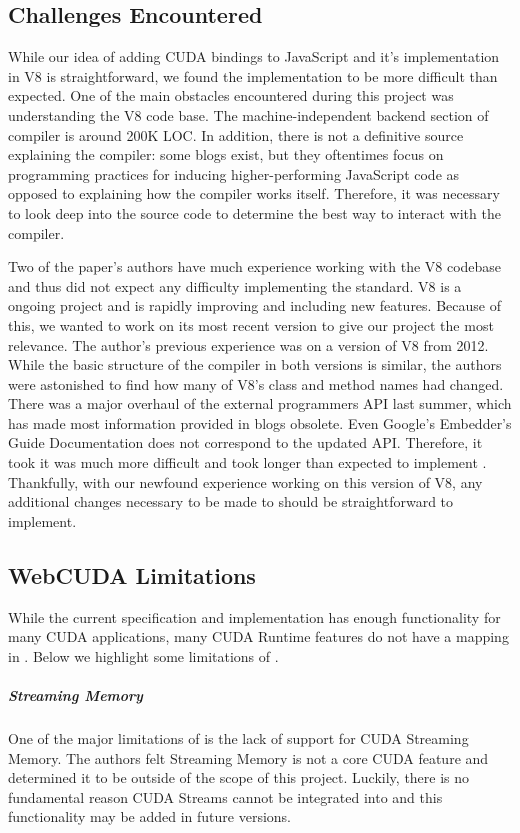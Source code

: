 

\subsection{Challenges Encountered} \label{challenges} While our idea of adding
CUDA bindings to JavaScript and it's implementation in V8 is straightforward,
we found the implementation to be more difficult than expected.  One of the main obstacles
encountered during this project was understanding the V8 code base. The
machine-independent backend section of compiler is around 200K LOC. In addition,
there is not a definitive source explaining the compiler: some blogs exist, but
they oftentimes focus on programming practices for inducing higher-performing
JavaScript code as opposed to explaining how the compiler works itself.
Therefore, it was necessary to look deep into the source code to determine the
best way to interact with the compiler.

Two of the paper's authors have much experience working with the V8 codebase and
thus did not expect any difficulty implementing the \name standard. V8 is a
ongoing project and is rapidly improving and including new features. Because of
this, we wanted to work on its most recent version to give our project the most
relevance. The author's previous experience was on a version of V8 from 2012.
While the basic structure of the compiler in both versions is similar, the
authors were astonished to find how many of V8's class and method names had
changed. There was a major overhaul of the external programmers API last summer,
which has made most information provided in blogs obsolete. Even Google's
Embedder's Guide Documentation \cite{embeddersGuide} does not correspond to the
updated API.  Therefore, it took it was much more difficult and took longer than
expected to implement \name. Thankfully, with our newfound experience working on
this version of V8, any additional changes necessary to be made to \name should
be straightforward to implement.

\subsection{WebCUDA Limitations}
While the current \name specification and implementation has enough
functionality for many CUDA applications, many CUDA Runtime features do not
have a mapping in \namens. Below we highlight some limitations of \namens.

\subparagraph{Streaming Memory} One of the major limitations of \namens is the
lack of support for CUDA Streaming Memory. The authors felt Streaming Memory is
not a core CUDA feature and determined it to be outside of the scope of this project.
Luckily, there is no fundamental reason CUDA Streams cannot be integrated into
\name and this functionality may be added in future versions.


